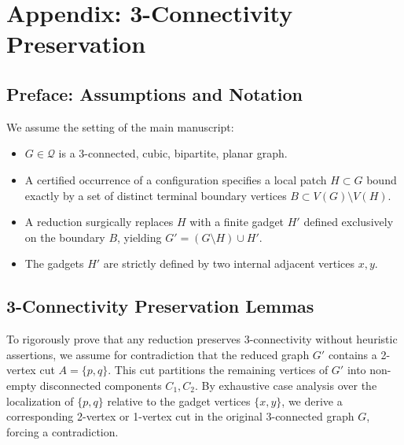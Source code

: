 \documentclass[12pt]{article}
\begin{document}
\section*{Appendix: 3-Connectivity Preservation}

\subsection*{Preface: Assumptions and Notation}
We assume the setting of the main manuscript:
\begin{itemize}
    \item $G \in \mathcal{Q}$ is a 3-connected, cubic, bipartite, planar graph.
    \item A certified occurrence of a configuration specifies a local patch $H \subset G$ bound exactly by a set of distinct terminal boundary vertices $B \subset V(G) \setminus V(H)$.
    \item A reduction surgically replaces $H$ with a finite gadget $H'$ defined exclusively on the boundary $B$, yielding $G' = (G \setminus H) \cup H'$.
    \item The gadgets $H'$ are strictly defined by two internal adjacent vertices $x, y$.
\end{itemize}

\subsection*{3-Connectivity Preservation Lemmas}

To rigorously prove that any reduction preserves 3-connectivity without heuristic assertions, we assume for contradiction that the reduced graph $G'$ contains a 2-vertex cut $A = \{p, q\}$. This cut partitions the remaining vertices of $G'$ into non-empty disconnected components $C_1, C_2$. By exhaustive case analysis over the localization of $\{p, q\}$ relative to the gadget vertices $\{x, y\}$, we derive a corresponding 2-vertex or 1-vertex cut in the original 3-connected graph $G$, forcing a contradiction.
\end{document}

